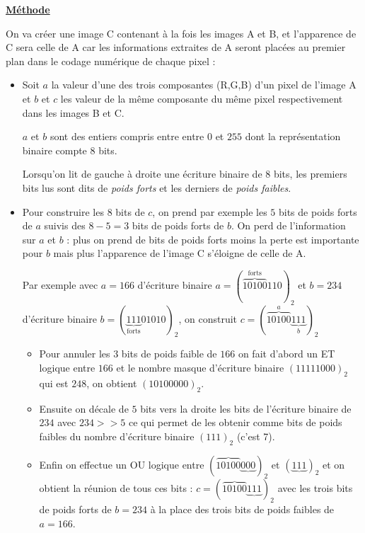 \documentclass[a4paper, french, 12pt]{article}  %
\newenvironment{methode}[1]
{\par \medskip   \begin{framed} \noindent\underline{\textbf{Méthode}} \hspace{0.5cm}{\itshape #1} \vspace*{10pt} \par  }
{\end{framed} \par \medskip }
\begin{document}
\begin{methode}{Application à la stéganographie}
On va créer une image C contenant à la fois les images A et B, et l'apparence de C sera celle de A car les informations extraites de A seront placées au \og{} premier plan \fg{} dans le codage numérique de chaque pixel  :

\begin{itemize}[label=]

\item Soit $a$ la valeur d'une des trois composantes (R,G,B) d'un pixel de l'image A et  $b$  et $c$ les valeur de la même composante du même pixel respectivement dans  les images B et C.

$a$ et $b$ sont des entiers compris entre  entre $0$ et $255$ dont la représentation binaire compte $8$ bits.

Lorsqu'on lit de gauche à droite une écriture binaire de 8 bits, les  premiers bits lus sont dits de \textit{poids forts} et les derniers de \textit{poids faibles}. 

\item Pour construire les $8$ bits de $c$, on prend par exemple les $5$ bits de poids forts de $a$ suivis des $8-5=3$ bits de poids forts de $b$. On perd de l'information sur $a$ et $b$ : plus on prend  de bits de poids forts moins la perte est importante pour $b$ mais plus l'apparence de l'image C s'éloigne de celle de A.

Par exemple avec $a=166$ d'écriture binaire $a = (\overbrace{10100}^{\text{forts}}110)_{2}$  et $b=234$ d'écriture binaire $b=(\underbrace{111}_{{\text{forts}}}01010)_{2}$, on construit $c= (\overbrace{10100}^{a}\underbrace{111}_{b})_{2}$

\begin{itemize}
 \item Pour annuler les $3$ bits de poids faible de $166$ on fait  d'abord un ET logique entre $166$ et le nombre \og{} masque \fg{} d'écriture binaire $(11111000)_{2}$ qui est  $248$, on obtient $(10100000)_{2}$. 

\item Ensuite on décale de $5$ bits vers la droite les bits de l'écriture binaire de $234$ avec $234>>5$ ce qui permet de les obtenir comme bits de poids faibles du nombre d'écriture binaire $(111)_{2}$ (c'est 7). 

\item Enfin on effectue un OU logique entre $(\overbrace{10100}\underbrace{000})_{2}$ et $(\underbrace{111})_{2}$ et on obtient la réunion de tous ces bits : $c=(\overbrace{10100}\underbrace{111})_{2}$ avec les trois bits de poids forts de $b=234$ à la place des trois bits de poids faibles de $a=166$.


\end{itemize}
\end{itemize}
\end{methode}
\end{document}

